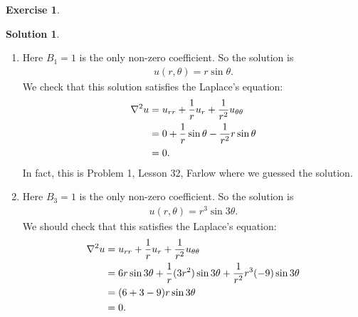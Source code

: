\documentclass{article}
\theoremstyle{definition}
\newtheorem*{exer*}{Exercise}
\newtheorem*{sln*}{Solution}
\newcommand{\f}[2]{\frac{#1}{#2}}
\begin{document}
\begin{exer*}
\begin{sln*}
\begin{enumerate}
			
			\item Here $B_1 = 1$ is the only non-zero coefficient. So the solution is
			\begin{align*}
			u(r,\theta) = r\sin\theta.
			\end{align*}
			We check that this solution satisfies the Laplace's equation:
			\begin{align*}
				\laplacian u &= u_{rr} + \f{1}{r}u_r + \f{1}{r^2}u_{\theta\theta}\\
				&= 0 + \f{1}{r}\sin\theta - \f{1}{r^2}r\sin\theta\\
				&= 0.
			\end{align*}
			In fact, this is Problem 1, Lesson 32, Farlow where we guessed the solution. 
			
			
			\item Here $B_3 = 1$ is the only non-zero coefficient. So the solution is
			\begin{align*}
			u(r,\theta) = r^3\sin 3\theta.
			\end{align*}
			We should check that this satisfies the Laplace's equation:
			\begin{align*}
			\laplacian u &= u_{rr} + \f{1}{r}u_r + \f{1}{r^2}u_{\theta\theta}\\
			&= 6r\sin 3\theta + \f{1}{r}(3r^2)\sin 3\theta + \f{1}{r^2}r^3(-9)\sin 3\theta\\
			&= (6 + 3 - 9)r\sin3\theta\\
			&= 0.
			\end{align*}
		\end{enumerate}
		
	\end{sln*}
\end{exer*}




\newpage
\end{document}
